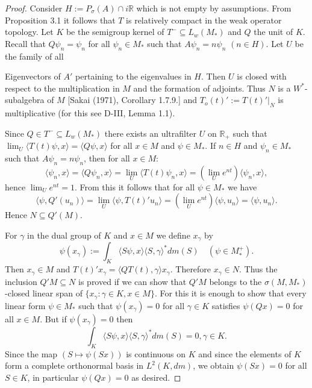 \begin{proof}
Consider $H := P_{\sigma}(A) \cap i\mathbb{R}$ which is not empty by assumptions.
From Proposition 3.1 it follows that $T$ is relatively compact in the weak operator topology.
Let $K$ be the semigroup kernel of $T^{-} \subseteq L_{w}(M_{*})$ and $Q$ the unit of $K$.
Recall that $Q\psi_{n} = \psi_{n}$ for all $\psi_{n} \in M_{*}$ such that $A\psi_{n} = n\psi_{n}$ $(n \in H)$.
Let $U$ be the family of all

\newpage

Eigenvectors of $A'$ pertaining to the eigenvalues in $H$.
Then $U$ is closed with respect to the multiplication in $M$ and the formation of adjoints.
Thus $N$ is a $W^*$-subalgebra of $M$ [Sakai (1971), Corollary 1.7.9.] and $T_{o}(t)' := T(t)'|_{N}$ is multiplicative (for this see D-III, Lemma 1.1).

Since $Q \in T^{-} \subseteq L_{w}(M_{*})$ there exists an ultrafilter $U$ on $\mathbb{R}_{+}$ such that $\lim_{U}\langle T(t)\psi,x\rangle = \langle Q\psi,x\rangle$ for all $x \in M$ and $\psi \in M_{*}$.
If $n \in H$ and $\psi_{n} \in M_{*}$ such that $A\psi_{n} = n\psi_{n}$, then for all $x \in M$:
\[
\langle\psi_{n},x\rangle = \langle Q\psi_{n},x\rangle = \lim_{U} \langle T(t)\psi_{n},x\rangle = (\lim_{U} e^{nt})\langle\psi_{n},x\rangle,
\]
hence $\lim_{U} e^{nt} = 1$.
From this it follows that for all $\psi \in M_{*}$ we have
\[
\langle\psi,Q'(u_{n})\rangle = \lim_{U} \langle\psi,T(t)'u_{n}\rangle = (\lim_{U} e^{nt})\langle\psi,u_{n}\rangle = \langle\psi,u_{n}\rangle.
\]
Hence $N \subseteq Q'(M)$.

For $\gamma$ in the dual group of $K$ and $x \in M$ we define $x_{\gamma}$ by
\[
\psi(x_{\gamma}) := \int_{K} \langle S\psi,x\rangle\langle S,\gamma\rangle^* dm(S) \quad (\psi \in M_{*}^{+}).
\]
Then $x_{\gamma} \in M$ and $T(t)'x_{\gamma} = \langle QT(t),\gamma\rangle x_{\gamma}$.
Therefore $x_{\gamma} \in N$.
Thus the inclusion $Q'M \subseteq N$ is proved if we can show that $Q'M$ belongs to the $\sigma(M,M_{*})$-closed linear span of $\{x_{\gamma} : \gamma \in K, x \in M\}$.
For this it is enough to show that every linear form $\psi \in M_{*}$ such that $\psi(x_{\gamma}) = 0$ for all $\gamma \in K$ satisfies $\psi(Qx) = 0$ for all $x \in M$.
But if $\psi(x_{\gamma}) = 0$ then
\[
\int_{K} \langle S\psi,x\rangle\langle S,\gamma\rangle^* dm(S) = 0, \gamma \in K.
\]
Since the map $(S \mapsto \psi(Sx))$ is continuous on $K$ and since the elements of $K$ form a complete orthonormal basis in $L^2(K,dm)$, we obtain $\psi(Sx) = 0$ for all $S \in K$, in particular $\psi(Qx) = 0$ as desired.


\end{proof}
